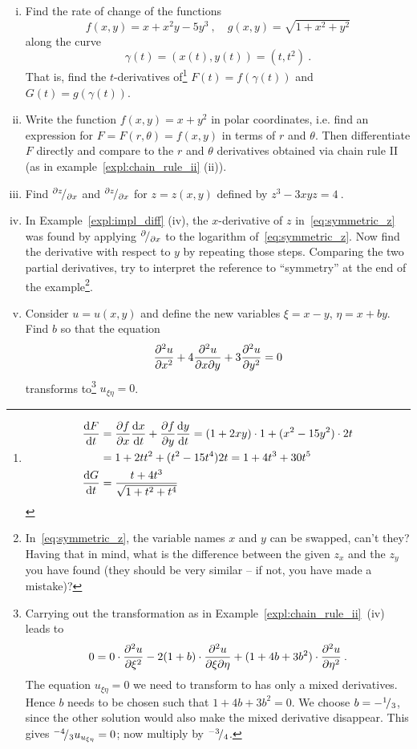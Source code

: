 \begin{exercise}
	\begin{enumerate}[(i)]
		\item Find the rate of change of the functions
		\[ f(x,y) = x + x^2y - 5y^3\:, \quad g(x,y) = \sqrt{1+x^2+y^2} \]
		along the curve
		\[ \gamma(t) = (x(t),y(t)) = (t,t^2) \:. \]
		That is, find the $t$-derivatives of\footnote{
		\[ \begin{split}
		\displaystyle{\frac{\mathrm{d}F}{\mathrm{d}t}} & = \displaystyle{\frac{\partial f}{\partial x}}\displaystyle{\frac{\mathrm{d}x}{\mathrm{d}t}} + \displaystyle{\frac{\partial f}{\partial y}}\displaystyle{\frac{\mathrm{d}y}{\mathrm{d}t}}
		= (1+2xy) \cdot 1 + (x^2-15y^2) \cdot 2t \\
		& = 1 + 2 t t^2 + (t^2-15t^4)2t = 1 + 4 t^3 + 30 t^5 \\
		\displaystyle{\frac{\mathrm{d}G}{\mathrm{d}t}} & = \frac{t+4t^3}{\sqrt{1+t^2+t^4}}
		\end{split} \]
		} $F(t)=f(\gamma(t))$ and $G(t)=g(\gamma(t))$.
		\item Write the function $f(x,y) = x+y^2$ in polar coordinates, i.e. find an expression for $F=F(r,\theta)=f(x,y)$ in terms of $r$ and $\theta$. Then differentiate $F$ directly and compare to the $r$ and $\theta$ derivatives obtained via chain rule II (as in example~\ref{expl:chain_rule_ii} (ii)).
		\item Find ${}^{\partial z}\!/_{\partial x}$ and ${}^{\partial z}\!/_{\partial x}$
		for $z=z(x,y)$ defined by $z^3-3xyz=4 \:.$ 
		\item In Example~\ref{expl:impl_diff} (iv), the $x$-derivative of $z$ in~\eqref{eq:symmetric_z} was found by applying ${}^{\partial}\!/_{\partial x}$ to the logarithm of~\eqref{eq:symmetric_z}. Now find the derivative with respect to $y$ by repeating those steps. Comparing the two partial derivatives, try to interpret the reference to ``symmetry'' at the end of the example\footnote{In~\eqref{eq:symmetric_z}, the variable names $x$ and $y$ can be swapped, can't they? Having that in mind, what is the difference between the given $z_x$ and the $z_y$ you have found (they should be very similar -- if not, you have made a mistake)?}.
		\item Consider $u=u(x,y)$ and define the new variables $\xi=x-y$, $\eta=x+by$. Find $b$ so that the equation
		\[ \displaystyle{\frac{\partial^2 u}{\partial x^2}} +4\displaystyle{\frac{\partial^2 u}{\partial{x}\partial{y}}} +3\displaystyle{\frac{\partial^2 u}{\partial y^2}} = 0 \]
		transforms to\footnote{Carrying out the transformation as in Example~\ref{expl:chain_rule_ii}~(iv) leads to
		\[ 0 = 0 \cdot \displaystyle{\frac{\partial^2 u}{\partial \xi^2}} - 2(1+b) \cdot \displaystyle{\frac{\partial^2 u}{\partial{\xi}\partial{\eta}}} 
		+ (1+4b+3b^2) \cdot \displaystyle{\frac{\partial^2 u}{\partial \eta^2}} \:. \]
		The equation $u_{\xi\eta}=0$ we need to transform to has only a mixed derivatives. Hence $b$ needs to be chosen such that $1+4b+3b^2=0$. We choose $b=-{}^{1}\!/_{3}$, since the other solution would also make the mixed derivative disappear. This gives ${}^{-4}\!/_{3}u_{u_{\xi\eta}}=0$; now multiply by ${}^{-3}\!/_{4}$.} $u_{\xi\eta}=0$.

\end{enumerate}
\end{exercise}
